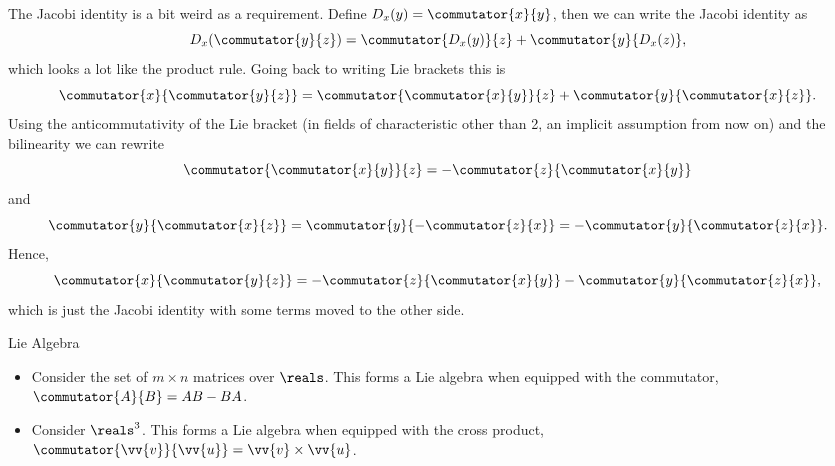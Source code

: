 \documentclass[fleqn]{NotesClass}
\begin{document}
    The Jacobi identity is a bit weird as a requirement.
    Define \(D_x(y) = \commutator{x}{y}\), then we can write the Jacobi identity as
    \begin{equation}
        D_x(\commutator{y}{z}) = \commutator{D_x(y)}{z} + \commutator{y}{D_x(z)},
    \end{equation}
    which looks a lot like the product rule.
    Going back to writing Lie brackets this is
    \begin{equation}
        \commutator{x}{\commutator{y}{z}} = \commutator{\commutator{x}{y}}{z} + \commutator{y}{\commutator{x}{z}}.
    \end{equation}
    Using the anticommutativity of the Lie bracket (in fields of characteristic other than 2, an implicit assumption from now on) and the bilinearity we can rewrite
    \begin{equation}
        \commutator{\commutator{x}{y}}{z} = -\commutator{z}{\commutator{x}{y}}
    \end{equation}
    and
    \begin{equation}
        \commutator{y}{\commutator{x}{z}} = \commutator{y}{-\commutator{z}{x}} = -\commutator{y}{\commutator{z}{x}}.
    \end{equation}
    Hence,
    \begin{equation}
        \commutator{x}{\commutator{y}{z}} = -\commutator{z}{\commutator{x}{y}} - \commutator{y}{\commutator{z}{x}},
    \end{equation}
    which is just the Jacobi identity with some terms moved to the other side.
    
    \begin{exm}{Lie Algebra}{}
        \begin{itemize}
            \item Consider the set of \(m \times n\) matrices over \(\reals\).
            This forms a Lie algebra when equipped with the commutator, \(\commutator{A}{B} = AB - BA\).
            \item Consider \(\reals^3\).
            This forms a Lie algebra when equipped with the cross product, \(\commutator{\vv{v}}{\vv{u}} = \vv{v} \times \vv{u}\).
        \end{itemize}
    \end{exm}
    
\end{document}
